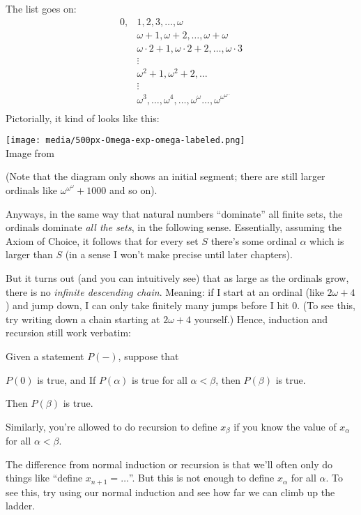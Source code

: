 The list goes on:
\[
\begin{aligned}
	0, & 1, 2, 3, \dots, \omega \\
	& \omega+1, \omega+2, \dots, \omega+\omega \\
	& \omega \cdot 2 + 1, \omega \cdot 2 + 2, \dots, \omega \cdot 3 \\
	& \vdots \\
	& \omega^2 + 1, \omega^2+2, \dots \\
	& \vdots \\
	& \omega^3, \dots, \omega^4, \dots, \omega^\omega
	\dots, \omega^{\omega^{\omega^{\dots}}} \\
\end{aligned}
\]
Pictorially, it kind of looks like this:
\begin{center}
	\texttt{[image: media/500px-Omega-exp-omega-labeled.png]}
	\\ \scriptsize Image from \cite{img:omega500}
\end{center}
(Note that the diagram only shows an initial segment;
there are still larger ordinals like $\omega^{\omega^{\omega}}+1000$ and so on).

Anyways, in the same way that natural numbers ``dominate'' all finite sets,
the ordinals dominate \emph{all the sets}, in the following sense.
Essentially, assuming the Axiom of Choice,
it follows that for every set $S$ there's some ordinal $\alpha$
which is larger than $S$ (in a sense I won't make precise until later chapters).

But it turns out (and you can intuitively see) that as large as the ordinals grow,
there is no \emph{infinite descending chain}.
Meaning: if I start at an ordinal (like $2 \omega + 4$) and jump down, I can only
take finitely many jumps before I hit $0$.
(To see this, try writing down a chain starting at $2 \omega + 4$ yourself.)
Hence, induction and recursion still work verbatim:
\begin{theorem}
	Given a statement $P(-)$, suppose that
	\begin{itemize}
		\ii $P(0)$ is true, and
		\ii If $P(\alpha)$ is true for all $\alpha < \beta$, then $P(\beta)$ is true.
	\end{itemize}
	Then $P(\beta)$ is true.
	\label{thm:transfinite}
\end{theorem}
Similarly, you're allowed to do recursion to define $x_\beta$ if you know the
value of $x_\alpha$ for all $\alpha < \beta$.

The difference from normal induction or recursion is that we'll often
only do things like ``define $x_{n+1} = \dots$''.
But this is not enough to define $x_\alpha$ for all $\alpha$.
To see this, try using our normal induction and see how far we can climb up the ladder.

